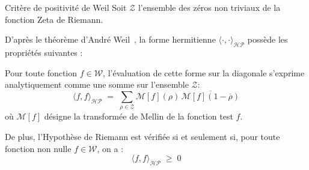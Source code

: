 \documentclass[Riemann_Hypothesis.tex]{subfiles}
\begin{document}
\begin{proposition}[label=pr:CriterePositiviteWeil_fr]{Critère de positivité de Weil}
    Soit $\mathcal{Z}$ l'ensemble des zéros non triviaux de
    la fonction Zeta de Riemann.\par
    D'après le théorème d'André Weil~\cite{weil1952_formules}, 
    la forme hermitienne $\langle \cdot, \cdot \rangle_{\mathcal{HP}}$ 
    possède les propriétés suivantes : \par
    Pour toute fonction $f \in \mathcal{W}$, l'évaluation de cette forme sur la
    diagonale s'exprime analytiquement comme une somme sur l'ensemble
    $\mathcal{Z}$:
    \begin{equation*}
        \langle f, f \rangle_{\mathcal{HP}} \;=\; \sum_{\rho \in \mathcal{Z}} \mathcal{M}[f](\rho) \, \overline{\mathcal{M}[f](1 - \overline{\rho})}
    \end{equation*}
    où $\mathcal{M}[f]$ désigne la transformée de Mellin de la fonction test $f$. \par
    De plus, l'Hypothèse de Riemann est vérifiée si et seulement si, pour toute fonction 
    non nulle $f \in \mathcal{W}$, on a :
    \begin{equation*}
        \langle f, f \rangle_{\mathcal{HP}} \;\geq\; 0
    \end{equation*}
\end{proposition}
\end{document}
